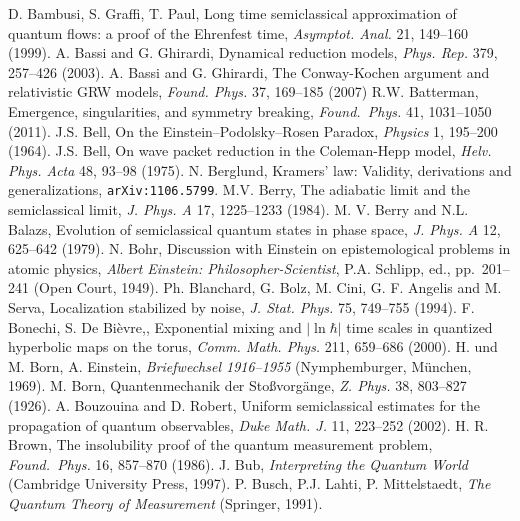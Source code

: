 \documentclass[12pt]{article}
\begin{document}
\begin{thebibliography}{99}\begin{footnotesize}
 D. Bambusi, S. Graffi, T. Paul, Long time semiclassical approximation of quantum flows: a proof of the Ehrenfest time, \emph{Asymptot. Anal.}  21, 149--160 (1999).
 A. Bassi and G. Ghirardi, Dynamical reduction models, \emph{Phys. Rep.} 379, 257--426 (2003).
 A. Bassi and G. Ghirardi, The Conway-Kochen argument and relativistic GRW models, \emph{Found. Phys.}  37, 169--185 (2007)
 R.W. Batterman, Emergence, singularities, and symmetry breaking, \emph{Found.\ Phys.} 41, 1031--1050 (2011).
 J.S. Bell, On the Einstein--Podolsky--Rosen Paradox, \emph{Physics} 1, 195--200 (1964).
 J.S. Bell, On wave packet reduction in the Coleman-Hepp model, \emph{Helv. Phys. Acta} 48, 93--98 (1975).
 N. Berglund, Kramers' law: Validity, derivations and generalizations, \texttt{arXiv:1106.5799}.
 M.V. Berry, The adiabatic limit and the semiclassical limit,   \emph{J. Phys. A}
17, 1225--1233 (1984).
 M. V. Berry and N.L. Balazs,  Evolution of semiclassical quantum states in phase space,  \emph{J. Phys. A} 12, 625--642 (1979).
  N. Bohr, Discussion with Einstein on epistemological problems in atomic physics, {\it Albert Einstein: Philosopher-Scientist}, P.A. Schlipp, ed.,  pp.\ 201--241 (Open Court, 1949).
 Ph. Blanchard, G. Bolz, M. Cini, G. F. Angelis and M. Serva, Localization stabilized by noise, 
 \emph{J. Stat. Phys.}  75, 749--755  (1994).
  F. Bonechi, S.  De Bi\`{e}vre,, Exponential mixing and $|\ln\hbar|$ time scales in quantized hyperbolic maps on the torus, \emph{Comm. Math. Phys.}  211, 659--686 (2000).
 H. und M. Born, A. Einstein, \emph{Briefwechsel 1916--1955} (Nymphemburger, M\"{u}nchen, 1969). 
 M. Born, Quantenmechanik der Sto\ss vorg\"{a}nge,  \emph{Z. Phys.} 38, 803--827 (1926).
 A. Bouzouina and D. Robert, Uniform semiclassical estimates for the propagation of quantum observables, \emph{Duke Math.  J.}  11, 223--252 (2002).
 H. R. Brown, The insolubility proof of the quantum measurement problem,
\emph{Found.\ Phys.} 16, 857--870  (1986).
 J. Bub, \emph{Interpreting the Quantum World} (Cambridge University Press, 1997).
  P. Busch, P.J.   Lahti,  P. Mittelstaedt, {\it The Quantum Theory of Measurement} (Springer, 1991).

\end{footnotesize}
\end{thebibliography}
\end{document}

